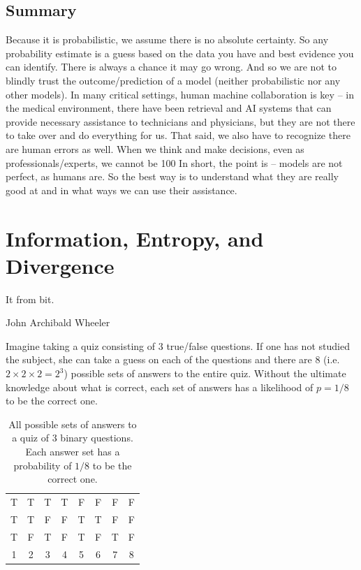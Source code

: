 \documentclass[
  letterpaper,
]{scrbook}
\begin{document}
\section{Summary}\label{summary}

Because it is probabilistic, we assume there is no absolute certainty.
So any probability estimate is a guess based on the data you have and
best evidence you can identify. ﻿﻿﻿﻿﻿﻿﻿﻿﻿﻿﻿There is always a chance it may go
wrong. And so we are not to blindly trust the outcome/prediction of a
model (neither probabilistic nor any other models). In many critical
settings, human machine collaboration is key -- in the medical
environment, there have been retrieval and AI systems that can provide
necessary assistance to technicians and physicians, but they are not
there to take over and do everything for us. That said, we also have to
recognize there are human errors as well. When we think and make
decisions, even as professionals/experts, we cannot be 100 In short, the
point is -- models are not perfect, as humans are. So the best way is to
understand what they are really good at and in what ways we can use
their assistance.

\chapter{Information, Entropy, and Divergence}\label{ch-information}

It from bit.

John Archibald Wheeler

Imagine taking a quiz consisting of \(3\) true/false questions. If one
has not studied the subject, she can take a guess on each of the
questions and there are \(8\) (i.e.~\(2\times2\times2=2^3\)) possible
sets of answers to the entire quiz. Without the ultimate knowledge about
what is correct, each set of answers has a likelihood of \(p = 1/8\) to
be the correct one.

\protect{}\label{tab-info-quiz}
\begin{longtable}[]{@{}cccccccc@{}}
\caption{All possible sets of answers to a quiz of \(3\) binary
questions. Each answer set has a probability of \(1/8\) to be the
correct one.}\tabularnewline
\toprule\noalign{}
\endfirsthead
\endhead
\bottomrule\noalign{}
\endlastfoot
T & T & T & T & F & F & F & F \\
T & T & F & F & T & T & F & F \\
T & F & T & F & T & F & T & F \\
1 & 2 & 3 & 4 & 5 & 6 & 7 & 8 \\
\end{longtable}
\end{document}
